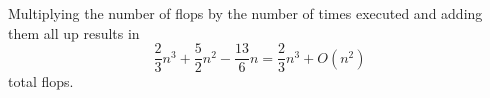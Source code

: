 \documentclass[11pt]{article}
\begin{document}
Multiplying the number of flops by the number of times executed and adding them all up results in 
$$\frac{2}{3}n^3 + \frac{5}{2}n^2 - \frac{13}{6}n = \frac{2}{3}n^3 + O(n^2)$$ total flops.

% 
\end{document}
